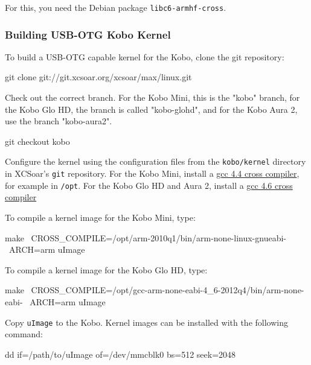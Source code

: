 For this, you need the Debian package \verb|libc6-armhf-cross|.

\subsubsection{Building USB-OTG Kobo Kernel}

To build a USB-OTG capable kernel for the Kobo, clone the git
repository:

\begin{verbatim*}
git clone git://git.xcsoar.org/xcsoar/max/linux.git
\end{verbatim*}

Check out the correct branch. For the Kobo Mini, this is the "kobo" branch,
for the Kobo Glo HD, the branch is called "kobo-glohd", and for the Kobo Aura 2,
use the branch "kobo-aura2".

\begin{verbatim*}
git checkout kobo
\end{verbatim*}

Configure the kernel using the configuration files from the \texttt{kobo/kernel}
directory in XCSoar's \texttt{git} repository. For the Kobo Mini, install a
\href{http://openlinux.amlogic.com:8000/download/ARM/gnutools/arm-2010q1-202-arm-none-linux-gnueabi-i686-pc-linux-gnu.tar.bz2}{gcc
  4.4 cross compiler}, for example in \texttt{/opt}. For the Kobo Glo HD and
Aura 2, install a
\href{https://launchpad.net/gcc-arm-embedded/4.6/4.6-2012-q4-update/+download/gcc-arm-none-eabi-4_6-2012q4-20121016.tar.bz2}{gcc
  4.6 cross compiler}

To compile a kernel image for the Kobo Mini, type:

\begin{verbatim*}
make \
  CROSS_COMPILE=/opt/arm-2010q1/bin/arm-none-linux-gnueabi- \
  ARCH=arm uImage
\end{verbatim*}

To compile a kernel image for the Kobo Glo HD, type:

\begin{verbatim*}
make \
  CROSS_COMPILE=/opt/gcc-arm-none-eabi-4_6-2012q4/bin/arm-none-eabi- \
  ARCH=arm uImage
\end{verbatim*}

Copy \texttt{uImage} to the Kobo.  Kernel images can be installed with
the following command:

\begin{verbatim*}
dd if=/path/to/uImage of=/dev/mmcblk0 bs=512 seek=2048
\end{verbatim*}

